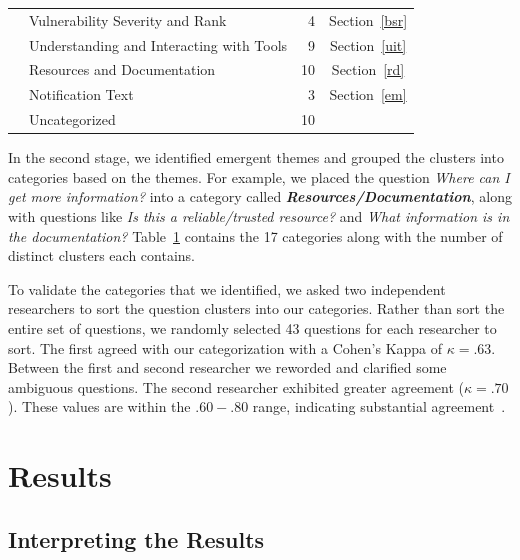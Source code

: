 \documentclass{acm_proc_article-sp}
\begin{document}
\begin{table}
\begin{tabular}{|l|l|r|c|}
    									& Vulnerability Severity and Rank											& 4     		& Section~\ref{bsr}		\\

    									& Understanding and Interacting with Tools						& 9     		& Section~\ref{uit}			\\

   	 									& Resources and Documentation									& 10     		& Section~\ref{rd}		\\

    									& Notification Text												& 3     		& Section~\ref{em}		\\
    \hline	
       									& Uncategorized													& 10    		&			 \\
    \hline
\end{tabular}
\label{table:categories}
\end{table}


In the second stage, we identified emergent themes and grouped the clusters into categories based on the themes. 
For example, we placed the question \textit{Where can I get more information?} into a category called \emph{\textbf{Resources/Documentation}}, along with questions like \textit{Is this a reliable/trusted resource?} and \textit{What information is in the documentation?} 
Table~\ref{table:categories} contains the 17 categories along with the number of distinct clusters each contains. 

To validate the categories that we identified, we asked two independent researchers to sort the question clusters into our categories. 
Rather than sort the entire set of questions, we randomly selected 43 questions for each researcher to sort.
The first agreed with our categorization with a Cohen's Kappa of $\kappa = .63$. 
Between the first and second researcher we reworded and clarified some ambiguous questions. The second researcher exhibited greater agreement ($\kappa = .70$). 
These values are within the $.60 - .80$ range, indicating substantial agreement~\cite{Landis1977agreement}.

\section{Results}

\subsection{Interpreting the Results}
\label{sec:results}
\end{document}
